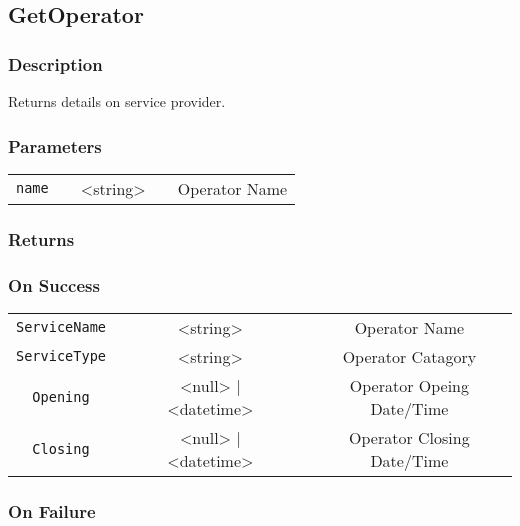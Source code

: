 \documentclass[a4paper,12pt]{article}
\begin{document}
\subsection{GetOperator}

\subsubsection{Description}

Returns details on service provider.

\subsubsection{Parameters}

\begin{tabular}{ccccc}
\verb!name! & \vspace{15mm} & <string> & \vspace{15mm} & Operator Name \\
\end{tabular}

\subsubsection{Returns}

\subsubsection{On Success}

\begin{tabular}{ccccc}
\verb!ServiceName! & \vspace{15mm} & <string> & \vspace{15mm} & Operator Name \\
\verb!ServiceType! & \vspace{15mm} & <string> & \vspace{15mm} & Operator Catagory \\
\verb!Opening! & \vspace{15mm} & <null> | <datetime> & \vspace{15mm} & Operator Opeing Date/Time \\
\verb!Closing! & \vspace{15mm} & <null> | <datetime> & \vspace{15mm} & Operator Closing Date/Time \\
\end{tabular}

\subsubsection{On Failure}
\end{document}
